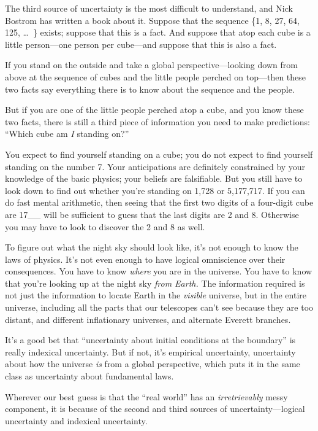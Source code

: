 {
 The third source of uncertainty is the most difficult to
understand, and Nick Bostrom has written a book about it. Suppose that
the sequence \{1, 8, 27, 64, 125,
\ldots~\} exists; suppose that this is
a fact. And suppose that atop each cube is a little person---one person
per cube---and suppose that this is also a fact.}

{
 If you stand on the outside and take a global
perspective---looking down from above at the sequence of cubes and the
little people perched on top---then these two facts say everything
there is to know about the sequence and the people.}

{
 But if you are one of the little people perched atop a cube, and
you know these two facts, there is still a third piece of information
you need to make predictions: ``Which cube am
\textit{I} standing on?''}

{
 You expect to find yourself standing on a cube; you do not expect
to find yourself standing on the number 7. Your anticipations are
definitely constrained by your knowledge of the basic physics; your
beliefs are falsifiable. But you still have to look down to find out
whether you're standing on 1,728 or 5,177,717. If you
can do fast mental arithmetic, then seeing that the first two digits of
a four-digit cube are 17\_\_ will be sufficient to guess that the last
digits are 2 and 8. Otherwise you may have to look to discover the 2
and 8 as well.}

{
 To figure out what the night sky should look like,
it's not enough to know the laws of physics.
It's not even enough to have logical omniscience over
their consequences. You have to know \textit{where} you are in the
universe. You have to know that you're looking up at
the night sky \textit{from Earth.} The information required is not just
the information to locate Earth in the \textit{visible} universe, but
in the entire universe, including all the parts that our telescopes
can't see because they are too distant, and different
inflationary universes, and alternate Everett branches.}

{
 It's a good bet that
``uncertainty about initial conditions at the
boundary'' is really indexical uncertainty. But if
not, it's empirical uncertainty, uncertainty about how
the universe \textit{is} from a global perspective, which puts it in
the same class as uncertainty about fundamental laws.}

{
 Wherever our best guess is that the ``real
world'' has an \textit{irretrievably} messy
component, it is because of the second and third sources of
uncertainty---logical uncertainty and indexical uncertainty.}

